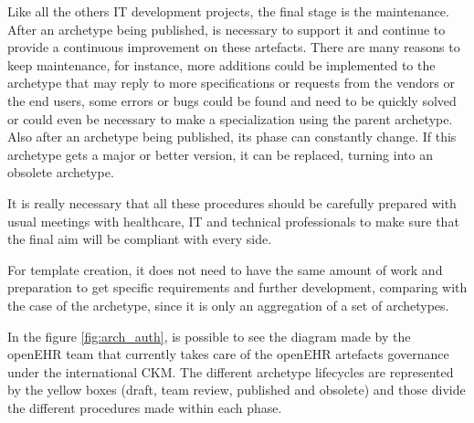 \documentclass[mim_thesis.tex]{subfiles}
\begin{document}
Like all the others IT development projects, the final stage is the maintenance. After an archetype being published, is necessary to support it and continue to provide a continuous improvement on these artefacts. There are many reasons to keep maintenance, for instance, more additions could be implemented to the archetype that may reply to more specifications or requests from the vendors or the end users, some errors or bugs could be found and need to be quickly solved or could even be necessary to make a specialization using the parent archetype. Also after an archetype being published, its phase can constantly change. If this archetype gets a major or better version, it can be replaced, turning into an obsolete archetype.

It is really necessary that all these procedures should be carefully prepared with usual meetings with healthcare, IT and technical professionals to make sure that the final aim will be compliant with every side.

For template creation, it does not need to have the same amount of work and preparation to get specific requirements and further development, comparing with the case of the archetype, since it is only an aggregation of a set of archetypes.

In the figure \ref{fig:arch_auth}, is possible to see the diagram made by the openEHR team \citep{Leslie2008} that currently takes care of the openEHR artefacts governance under the international CKM. The different archetype lifecycles are represented by the yellow boxes (draft, team review, published and obsolete) and those divide the different procedures made within each phase. 
\end{document}
